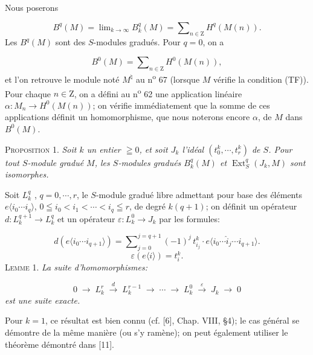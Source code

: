 Nous poserons

\begin{equation*}
B^q(M) = \lim\nolimits_{k \to \infty} B_k^q(M) = \sum\nolimits_{n \in \mathrm{Z}} H^q(M(n)).
\end{equation*}
Les $B^q(M)$ sont des $S$-modules gradués. Pour $q = 0$, on a

\begin{equation*}
B^0(M) = \sum\nolimits_{n \in \mathrm{Z}} H^0(M(n)),
\end{equation*}
et l'on retrouve le module noté $M^\natural$ au n\textsuperscript{o} 67 (lorsque $M$ vérifie la condition (TF)). Pour chaque $n \in \mathrm{Z}$, on a défini au n\textsuperscript{o} 62 une application linéaire $\alpha:M_n \to H^0(M(n))$; on vérifie immédiatement que la somme de ces applications définit un homomorphisme, que nous noterons encore $\alpha$, de $M$ dans $B^0(M)$.

\textsc{Proposition} 1. \textit{Soit $k$ un entier $\geqq 0$, et soit $J_k$ l'idéal $(t_0^k , \cdots , t_r^k)$ de $S$. Pour tout $S$-module gradué $M$, les $S$-modules gradués $B_k^q(M)$ et $\operatorname{Ext}_S^q(J_k , M)$ sont isomorphes.}

Soit $L_k^q$ , $q = 0, \cdots , r$, le $S$-module gradué libre admettant pour base des éléments $e\langle i_0 \cdots i_q \rangle$, $0 \leqq i_0 < i_1 < \cdots < i_q \leqq r$, de degré $k(q + 1)$; on définit un opérateur $d:L_k^{q+1} \to L_k^q$ et un opérateur $\varepsilon:L_k^0 \to J_k$ par les formules:

\begin{equation*}
d(e\langle i_0 \cdots i_{q+1} \rangle) = \sum\nolimits_{j=0}^{j=q+1} (-1)^j \, t_{i_j}^k \cdot e\langle i_0 \cdots \hat{i}_j \cdots i_{q+1} \rangle.
\end{equation*}
\begin{equation*}
\varepsilon(e\langle i \rangle) = t_i^k .
\end{equation*}
\textsc{Lemme} 1. \textit{La suite d'homomorphismes:}

\begin{equation*}
0 \; \to \; L_k^r \; \stackrel{d}{\longrightarrow} \; L_k^{r-1} \; \to \; \cdots \; \to \; L_k^0 \; \stackrel{\varepsilon}{\longrightarrow} \; J_k \; \to \; 0
\end{equation*}
\textit{est une suite exacte.}

Pour $k = 1$, ce résultat est bien connu (cf. [6], Chap. VIII, \S4); le cas général se démontre de la même manière (ou s'y ramène); on peut également utiliser le théorème démontré dans [11].



